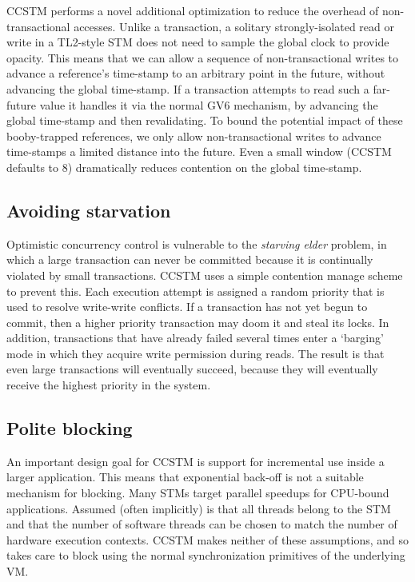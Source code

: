CCSTM performs a novel additional optimization to reduce the overhead
of non-transactional accesses.  Unlike a transaction, a solitary
strongly-isolated read or write in a TL2-style STM does not need to
sample the global clock to provide opacity.  This means that we can allow
a sequence of non-transactional writes to advance a reference's time-stamp to
an arbitrary point in the future, without advancing the global time-stamp.
If a transaction attempts to read such a far-future value it handles
it via the normal GV6 mechanism, by advancing the global time-stamp and
then revalidating.  To bound the potential impact of these booby-trapped
references, we only allow non-transactional writes to advance time-stamps
a limited distance into the future.  Even a small window (CCSTM defaults
to 8) dramatically reduces contention on the global time-stamp.

\subsection{Avoiding starvation}

Optimistic concurrency control is vulnerable to the \textit{starving
elder} problem, in which a large transaction can never be committed because
it is continually violated by small transactions.  CCSTM uses a simple
contention manage scheme to prevent this.  Each execution attempt is
assigned a random priority that is used to resolve write-write conflicts.
If a transaction has not yet begun to commit, then a higher priority
transaction may doom it and steal its locks.  In addition, transactions
that have already failed several times enter a `barging' mode in which
they acquire write permission during reads.  The result is that even
large transactions will eventually succeed, because they will eventually
receive the highest priority in the system.

\subsection{Polite blocking}

An important design goal for CCSTM is support for incremental use inside
a larger application.  This means that exponential back-off is not a
suitable mechanism for blocking.  Many STMs target parallel speedups
for CPU-bound applications.  Assumed (often implicitly) is that all
threads belong to the STM and that the number of software threads can be
chosen to match the number of hardware execution contexts.  CCSTM makes
neither of these assumptions, and so takes care to block using the normal
synchronization primitives of the underlying VM.


